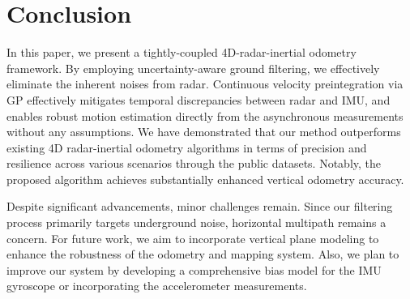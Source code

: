 \section{Conclusion}
\label{sec:conclusion}

In this paper, we present a tightly-coupled 4D-radar-inertial odometry framework. By employing uncertainty-aware ground filtering, we effectively eliminate the inherent noises from radar. Continuous velocity preintegration via \ac{GP} effectively mitigates temporal discrepancies between radar and \ac{IMU}, and enables robust motion estimation directly from the asynchronous measurements without any assumptions.
We have demonstrated that our method outperforms existing 4D radar-inertial odometry algorithms in terms of precision and resilience across various scenarios through the public datasets.
Notably, the proposed algorithm achieves substantially enhanced vertical odometry accuracy.

Despite significant advancements, minor challenges remain. Since our filtering process primarily targets underground noise, horizontal multipath remains a concern. For future work, we aim to incorporate vertical plane modeling to enhance the robustness of the odometry and mapping system. Also, we plan to improve our system by developing a comprehensive bias model for the IMU gyroscope or incorporating the accelerometer measurements.

\newpage